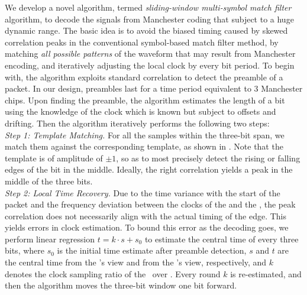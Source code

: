 We develop a novel algorithm, termed \textit{sliding-window multi-symbol match filter} algorithm, to decode the signals from Manchester coding that subject to a huge dynamic range. %
The basic idea is to avoid the biased timing caused by skewed correlation peaks in the conventional symbol-based match filter method, by matching \textit{all possible patterns} of the waveform that may result from Manchester encoding, and iteratively adjusting the local clock by every bit period. To begin with, the algorithm exploits standard correlation to detect the preamble of a packet. In our design, preambles last for a time period equivalent to 3 Manchester chips.
Upon finding the preamble, the algorithm estimates the length of a bit using the knowledge of the \vitag clock which is known but subject to offsets and drifting. Then the algorithm iteratively performs the following two steps:
\\[4pt]
\noindent\textit{Step 1: Template Matching.} For all the samples within the three-bit span, we match them against the corresponding template, as shown in . Note that the template is of amplitude of $\pm1$, so as to most precisely detect the rising or falling edges of the bit in the middle. Ideally, the right correlation yields a peak in the middle of the three bits. 
\\[4pt]
\noindent\textit{Step 2: Local Time Recovery.} 
Due to the time variance with the start of the packet and the frequency deviation between the clocks of the \reader and the \vitag, the peak correlation does not necessarily align with the actual timing of the edge. This yields errors in clock estimation. To bound this error as the decoding goes, we perform linear regression $t=k\cdot s+s_0$ to estimate the central time of every three bits, where $s_0$ is the initial time estimate after preamble detection, $s$ and $t$ are the central time from the \reader's view and from the \vitag's view, respectively, and $k$ denotes the clock sampling ratio of the \vitag\ over \reader. Every round $k$ is re-estimated, and then the algorithm moves the three-bit window one bit forward.
 
